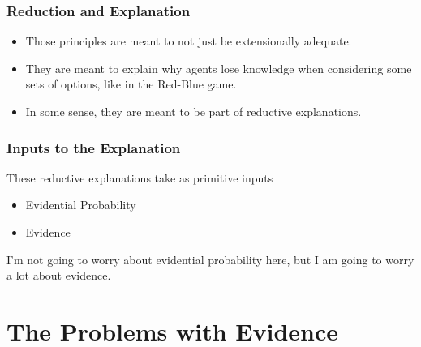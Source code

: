 \begin{frame}

\frametitle{Reduction and Explanation}
\label{reductionandexplanation}

\begin{itemize}
\item Those principles are meant to not just be extensionally adequate.

\item They are meant to explain why agents lose knowledge when considering some sets of options, like in the Red-Blue game.

\item In some sense, they are meant to be part of reductive explanations.

\end{itemize}

\end{frame}

\begin{frame}

\frametitle{Inputs to the Explanation}
\label{inputstotheexplanation}

These reductive explanations take as primitive inputs

\begin{itemize}
\item Evidential Probability

\item Evidence

\end{itemize}

I'm not going to worry about evidential probability here, but I am going to worry a lot about evidence.

\end{frame}

\section{The Problems with Evidence}
\label{theproblemswithevidence}

